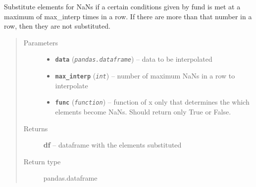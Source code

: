 \documentclass[a4paper,10pt,oneside]{sphinxmanual}
\begin{document}
\begin{fulllineitems}
\label{pymicra.algs:pymicra.algs.general.limitedSubs}
Substitute elements for NaNs if a certain conditions given by fund is met at
a maximum of max\_interp times in a row.
If there are more than that number in a row, then they are not substituted.
\begin{quote}\begin{description}
\item[{Parameters}] \leavevmode\begin{itemize}
\item {} 
\textbf{\texttt{data}} (\emph{\texttt{pandas.dataframe}}) -- data to be interpolated

\item {} 
\textbf{\texttt{max\_interp}} (\emph{\texttt{int}}) -- number of maximum NaNs in a row to interpolate

\item {} 
\textbf{\texttt{func}} (\emph{\texttt{function}}) -- function of x only that determines the which elements become NaNs. Should return
only True or False.

\end{itemize}

\item[{Returns}] \leavevmode
\textbf{df} -- dataframe with the elements substituted

\item[{Return type}] \leavevmode
pandas.dataframe

\end{description}\end{quote}

\end{fulllineitems}

\end{document}
